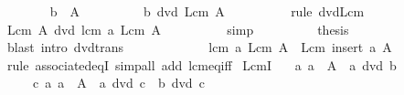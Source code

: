 \begin{isabellebody}
\isanewline
\ \ \ \ \ \ \isamarkupfalse%
\ {\isachardoublequoteopen}b\ {\isasymin}\ A{\isachardoublequoteclose}\isanewline
\ \ \ \ \ \ \isamarkupfalse%
\ \isamarkupfalse%
\ {\isachardoublequoteopen}b\ dvd\ Lcm\ A{\isachardoublequoteclose}\isanewline
\ \ \ \ \ \ \ \ \isamarkupfalse%
\ {\isacharparenleft}{\kern0pt}rule\ dvd{\isacharunderscore}{\kern0pt}Lcm{\isacharparenright}{\kern0pt}\isanewline
\ \ \ \ \ \ \isamarkupfalse%
\ \isamarkupfalse%
\ {\isachardoublequoteopen}Lcm\ A\ dvd\ lcm\ a\ {\isacharparenleft}{\kern0pt}Lcm\ A{\isacharparenright}{\kern0pt}{\isachardoublequoteclose}\isanewline
\ \ \ \ \ \ \ \ \isamarkupfalse%
\ simp\isanewline
\ \ \ \ \ \ \isamarkupfalse%
\ \isamarkupfalse%
\ {\isacharquery}{\kern0pt}thesis\isanewline
\ \ \ \ \ \ \ \ \isamarkupfalse%
\ {\isacharparenleft}{\kern0pt}blast\ intro{\isacharcolon}{\kern0pt}\ dvd{\isacharunderscore}{\kern0pt}trans{\isacharparenright}{\kern0pt}\isanewline
\ \ \ \ \isamarkupfalse%
\isanewline
\ \ \isamarkupfalse%
\isanewline
\ \ \isamarkupfalse%
\ \isamarkupfalse%
\ {\isachardoublequoteopen}lcm\ a\ {\isacharparenleft}{\kern0pt}Lcm\ A{\isacharparenright}{\kern0pt}\ {\isacharequal}{\kern0pt}\ Lcm\ {\isacharparenleft}{\kern0pt}insert\ a\ A{\isacharparenright}{\kern0pt}{\isachardoublequoteclose}\isanewline
\ \ \ \ \isamarkupfalse%
\ {\isacharparenleft}{\kern0pt}rule\ associated{\isacharunderscore}{\kern0pt}eqI{\isacharparenright}{\kern0pt}\ {\isacharparenleft}{\kern0pt}simp{\isacharunderscore}{\kern0pt}all\ add{\isacharcolon}{\kern0pt}\ lcm{\isacharunderscore}{\kern0pt}eq{\isacharunderscore}{\kern0pt}{}{\isacharunderscore}{\kern0pt}iff{\isacharparenright}{\kern0pt}\isanewline
{}\isamarkupfalse%
%
\endisatagproof
{\isafoldproof}%
%
\isadelimproof
\isanewline
%
\endisadelimproof
\isanewline
{}\isamarkupfalse%
\ LcmI{\isacharcolon}{\kern0pt}\isanewline
\ \ \ {\isachardoublequoteopen}{\isasymAnd}a{\isachardot}{\kern0pt}\ a\ {\isasymin}\ A\ {\isasymLongrightarrow}\ a\ dvd\ b{\isachardoublequoteclose}\isanewline
\ \ \ \ \ {\isachardoublequoteopen}{\isasymAnd}c{\isachardot}{\kern0pt}\ {\isacharparenleft}{\kern0pt}{\isasymAnd}a{\isachardot}{\kern0pt}\ a\ {\isasymin}\ A\ {\isasymLongrightarrow}\ a\ dvd\ c{\isacharparenright}{\kern0pt}\ {\isasymLongrightarrow}\ b\ dvd\ c{\isachardoublequoteclose}\isanewline

\end{isabellebody}
